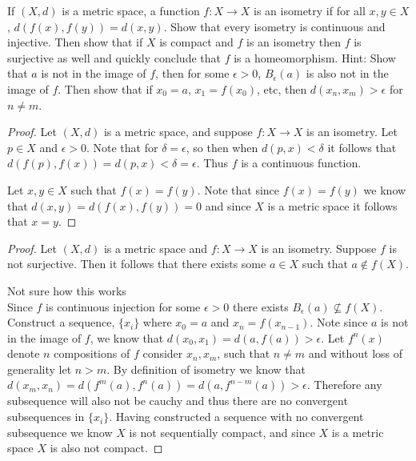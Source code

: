 \documentclass[minion]{homework651}
\begin{document}
\begin{problems}
\problem If $(X,d)$ is a metric space, a function $f:X\rightarrow X$ is an isometry if
for all $x,y\in X$, $d(f(x),f(y))=d(x,y)$.  Show that every isometry is continuous and injective.
Then show that if  $X$ is compact and $f$ is an isometry 
then $f$ is surjective  as well and quickly conclude that $f$ is a homeomorphism. Hint:
Show that $a$ is not in the image of $f$, then for some $\epsilon>0$, $B_\epsilon(a)$
is also not in the image of $f$.  Then show that if $x_0=a$, $x_1=f(x_0)$, etc, then 
$d(x_n,x_m)>\epsilon$ for $n\neq m$.

\begin{proof} Let $(X,d)$ is a metric space, and suppose $f:X\rightarrow X$ is an isometry. 
    Let $p \in X$ and $\epsilon > 0$. Note that for $\delta = \epsilon$, so then when $d(p, x)< \delta$ it follows that 
    $d(f(p), f(x)) = d(p, x) < \delta = \epsilon$. Thus $f$ is a continuous function.  

    Let $x, y \in X$ such that $f(x) = f(y)$. Note that since $f(x) = f(y)$ we know that $d(x, y) = d(f(x), f(y)) = 0$ and 
    since $X$ is a metric space it follows that $x = y$.  
\end{proof}

\begin{proof} Let $(X,d)$ is a metric space and $f:X\rightarrow X$ is an isometry. Suppose $f$ is 
    not surjective. Then it follows that there exists some $a \in X$ such that $a \not\in f(X)$. 

    Not sure how this works \\
    Since $f$ is continuous injection for some $\epsilon>0$ there exists $B_{\epsilon}(a) \not\subseteq f(X)$. 
    Construct a sequence, $\{x_i\}$ where $x_0 = a$ and $x_n = f(x_{n - 1})$. Note since $a$ is not in the image of $f$, 
    we know that $d(x_0, x_1) = d(a, f(a)) > \epsilon$. Let $f^n(x)$ denote $n$ compositions of $f$ consider $x_n, x_m$, such that 
    $n \neq m$ and without loss of generality let $n > m$. By definition of isometry we know that
    $d(x_m, x_n) = d(f^m(a), f^n(a)) = d(a, f^{n - m}(a)) > \epsilon$. Therefore any subsequence will also not be cauchy 
    and thus there are no convergent subsequences in $\{x_i\}$. Having constructed a sequence with no convergent subsequence 
    we know $X$ is not sequentially compact, and since $X$ is a metric space $X$ is also not compact. 
\end{proof}








\end{problems}
\end{document}
